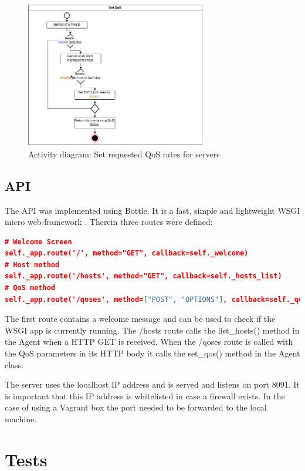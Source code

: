 \begin{figure}[H]
\centering

\includegraphics[width=0.7\textwidth]{images/design/activity_set_qos}

\caption{Activity diagram: Set requested QoS rates for servers}
\end{figure}


\subsection{API}

The API was implemented using Bottle. It is a fast, simple and lightweight WSGI micro web-framework \cite{bottle-docs}. Therein three routes were defined:
\begin{lstlisting}[language=json]
# Welcome Screen
self._app.route('/', method="GET", callback=self._welcome)
# Host method
self._app.route('/hosts', method="GET", callback=self._hosts_list)
# QoS method
self._app.route('/qoses', method=["POST", "OPTIONS"], callback=self._qoses_set)
\end{lstlisting}

The first route contains a welcome message and can be used to check if the WSGI app is currently running.
The /hosts route calls the list\_hosts() method in the Agent when a HTTP GET is received.
When the /qoses route is called with the QoS parameters in its HTTP body it calls the set\_qos() method in the Agent class.

The server uses the localhost IP address and is served and listens on port 8091. It is important that this IP address is whitelisted in case a firewall exists. In the case of using a Vagrant box the port needed to be forwarded to the local machine.

\section{Tests}


